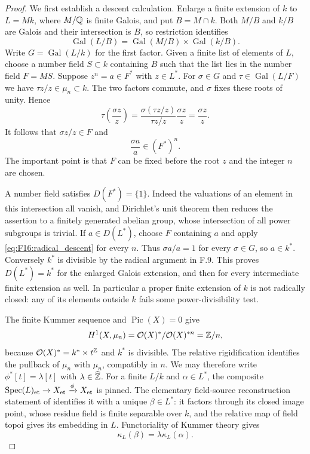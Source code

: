 \begin{proof}
We first establish a descent calculation. Enlarge a finite extension
of $k$ to $L=Mk$, where $M/\mathbb Q$ is finite Galois, and put
$B=M\cap k$. Both $M/B$ and $k/B$ are Galois and their intersection
is $B$, so restriction identifies
\[
 \operatorname{Gal}(L/B)=
 \operatorname{Gal}(M/B)\times\operatorname{Gal}(k/B).
\]
Write $G=\operatorname{Gal}(L/k)$ for the first factor. Given a
finite list of elements of $L$, choose a number field $S\subset k$
containing $B$ such that the list lies in the number field $F=MS$.
Suppose $z^n=a\in F^*$ with $z\in L^*$. For $\sigma\in G$ and
$\tau\in\operatorname{Gal}(L/F)$ we have
$\tau z/z\in\mu_n\subset k$. The two factors commute, and
$\sigma$ fixes these roots of unity. Hence
\[
 \tau\left(\frac{\sigma z}{z}\right)
 =\frac{\sigma(\tau z/z)}{\tau z/z}
       \frac{\sigma z}{z}
 =\frac{\sigma z}{z}.
\]
It follows that $\sigma z/z\in F$ and
\begin{equation}\label{eq:F16:radical_descent}
 \frac{\sigma a}{a}\in(F^*)^n.
\end{equation}
The important point is that $F$ can be fixed before the root $z$
and the integer $n$ are chosen.

A number field satisfies $D(F^*)=\{1\}$. Indeed the valuations of
an element in this intersection all vanish, and Dirichlet's unit
theorem then reduces the assertion to a finitely generated abelian
group, whose intersection of all power subgroups is trivial. If
$a\in D(L^*)$, choose $F$ containing $a$ and apply
\eqref{eq:F16:radical_descent} for every $n$. Thus
$\sigma a/a=1$ for every $\sigma\in G$, so $a\in k^*$.
Conversely $k^*$ is divisible by the radical argument in F.9.
This proves $D(L^*)=k^*$ for the enlarged Galois extension, and
then for every intermediate finite extension as well. In particular
a proper finite extension of $k$ is not radically closed: any of its
elements outside $k$ fails some power-divisibility test.

The finite Kummer sequence and $\operatorname{Pic}(X)=0$ give
\[
 H^1(X,\mu_n)=\mathcal O(X)^*/\mathcal O(X)^{*n}
 =\mathbb Z/n,
\]
because $\mathcal O(X)^*=k^*\times t^\mathbb Z$ and $k^*$ is divisible.
The relative rigidification identifies the pullback of $\mu_n$ with
$\mu_n$, compatibly in $n$. We may therefore write
$\phi^*[t]=\lambda[t]$ with $\lambda\in\widehat{\mathbb Z}$.
For a finite $L/k$ and $\alpha\in L^*$, the composite
$\operatorname{Spec}(L)_{\mathrm{et}}\to X_{\mathrm{et}}
 \xrightarrow{\phi}X_{\mathrm{et}}$ is pinned. The elementary
field-source reconstruction statement of
\citet[Section~3, proposition on reconstruction for fields]{F_CHW2024}
identifies it with a unique $\beta\in L^*$: it factors through its
closed image point, whose residue field is finite separable over
$k$, and the relative map of field topoi gives its embedding in $L$.
Functoriality of Kummer theory gives
\begin{equation}\label{eq:F16:point_kummer}
 \kappa_L(\beta)=\lambda\kappa_L(\alpha).
\end{equation}


\end{proof}
